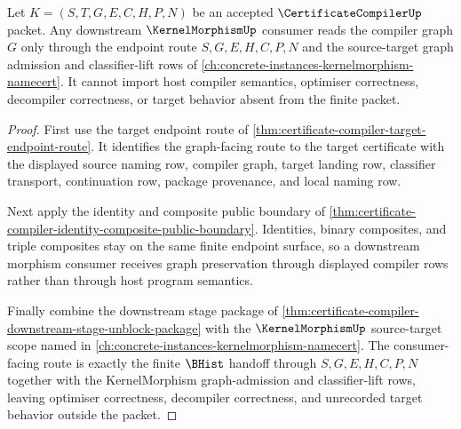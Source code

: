 \begin{theorem}
\label{thm:certificate-compiler-kernelmorphism-route-scope}
Let $K=(S,T,G,E,C,H,P,N)$ be an accepted $\CertificateCompilerUp$ packet. Any downstream $\KernelMorphismUp$ consumer reads the compiler graph $G$ only through the endpoint route $S,G,E,H,C,P,N$ and the source-target graph admission and classifier-lift rows of \autoref{ch:concrete-instances-kernelmorphism-namecert}. It cannot import host compiler semantics, optimiser correctness, decompiler correctness, or target behavior absent from the finite packet.
\end{theorem}
\begin{proof}
First use the target endpoint route of \autoref{thm:certificate-compiler-target-endpoint-route}. It identifies the graph-facing route to the target certificate with the displayed source naming row, compiler graph, target landing row, classifier transport, continuation row, package provenance, and local naming row.

Next apply the identity and composite public boundary of \autoref{thm:certificate-compiler-identity-composite-public-boundary}. Identities, binary composites, and triple composites stay on the same finite endpoint surface, so a downstream morphism consumer receives graph preservation through displayed compiler rows rather than through host program semantics.

Finally combine the downstream stage package of \autoref{thm:certificate-compiler-downstream-stage-unblock-package} with the $\KernelMorphismUp$ source-target scope named in \autoref{ch:concrete-instances-kernelmorphism-namecert}. The consumer-facing route is exactly the finite $\BHist$ handoff through $S,G,E,H,C,P,N$ together with the KernelMorphism graph-admission and classifier-lift rows, leaving optimiser correctness, decompiler correctness, and unrecorded target behavior outside the packet.
\end{proof}

